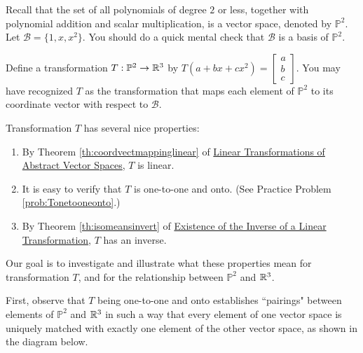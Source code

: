 \documentclass{ximera}
\begin{document}
\begin{exploration}\label{init:isomorph}
Recall that the set of all polynomials of degree $2$ or less, together with polynomial addition and scalar multiplication, is a vector space, denoted by $\mathbb{P}^2$.  Let $\mathcal{B}=\{1, x, x^2\}$. You should do a quick mental check that $\mathcal{B}$ is a basis of $\mathbb{P}^2$.

Define a transformation $T:\mathbb{P}^2\rightarrow \mathbb{R}^3$ by
$T(a+bx+cx^2)=\begin{bmatrix}a\\b\\c\end{bmatrix}$.  You may have recognized $T$ as the transformation that maps each element of $\mathbb{P}^2$ to its coordinate vector with respect to $\mathcal{B}$.  

Transformation $T$ has several nice properties:
  \begin{enumerate}
      \item By Theorem \ref{th:coordvectmappinglinear} of \href{https://ximera.osu.edu/oerlinalg/LinearAlgebra/LTR-0022/main}{Linear Transformations of Abstract Vector Spaces}, $T$ is linear.
      \item It is easy to verify that $T$ is one-to-one and onto. (See Practice Problem \ref{prob:Tonetooneonto}.)
      \item By Theorem \ref{th:isomeansinvert} of \href{https://ximera.osu.edu/oerlinalg/LinearAlgebra/LTR-0035/main}{Existence of the Inverse of a Linear Transformation}, $T$ has an inverse.
  \end{enumerate}
  
  Our goal is to investigate and illustrate what these properties mean for transformation $T$, and for the relationship between $\mathbb{P}^2$ and $\mathbb{R}^3$.  
  
  First, observe that $T$ being one-to-one and onto establishes ``pairings" between elements of $\mathbb{P}^2$ and $\mathbb{R}^3$ in such a way that every element of one vector space is uniquely matched with exactly one element of the other vector space, as shown in the diagram below.
  
 \begin{center}
\end{center}
\end{exploration}
\end{document}
